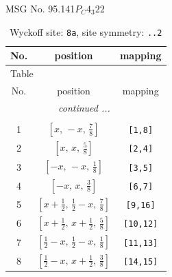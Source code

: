 \documentclass[fleqn,8pt]{jsarticle}
\begin{document}
\setcounter{MaxMatrixCols}{32}

\renewcommand{\tablename}{Table~}
\renewcommand{\figurename}{Figure~}
\begin{center}
\LARGE
MSG No. 95.141\quad$P_{C}4_{3}22$
\end{center}
\renewcommand{\arraystretch}{1.2}
\begin{longtable}{ccc}
\caption{Wyckoff site: {\tt 8a}, site symmetry: {\tt ..2}}
 \\
 \hline \hline
No. & position & mapping \\ \hline \endfirsthead

\multicolumn{2}{l}{\tablename\ \thetable{}} \\
 \hline \hline
No. & position & mapping \\ \hline \endhead

 \hline \hline
\multicolumn{2}{r}{\footnotesize\it continued ...} \\ \endfoot

 \hline \hline
\multicolumn{2}{r}{} \\ \endlastfoot

1 & $\left[ x,\, - x,\, \frac{7}{8} \right]$ & {\tt [1,8]} \\ \hline
2 & $\left[ x,\, x,\, \frac{5}{8} \right]$ & {\tt [2,4]} \\ \hline
3 & $\left[ - x,\, - x,\, \frac{1}{8} \right]$ & {\tt [3,5]} \\ \hline
4 & $\left[ - x,\, x,\, \frac{3}{8} \right]$ & {\tt [6,7]} \\ \hline
5 & $\left[ x + \frac{1}{2},\, \frac{1}{2} - x,\, \frac{7}{8} \right]$ & {\tt [9,16]} \\ \hline
6 & $\left[ x + \frac{1}{2},\, x + \frac{1}{2},\, \frac{5}{8} \right]$ & {\tt [10,12]} \\ \hline
7 & $\left[ \frac{1}{2} - x,\, \frac{1}{2} - x,\, \frac{1}{8} \right]$ & {\tt [11,13]} \\ \hline
8 & $\left[ \frac{1}{2} - x,\, x + \frac{1}{2},\, \frac{3}{8} \right]$ & {\tt [14,15]} \\
\end{longtable}
\renewcommand{\arraystretch}{1.2}
\end{document}
